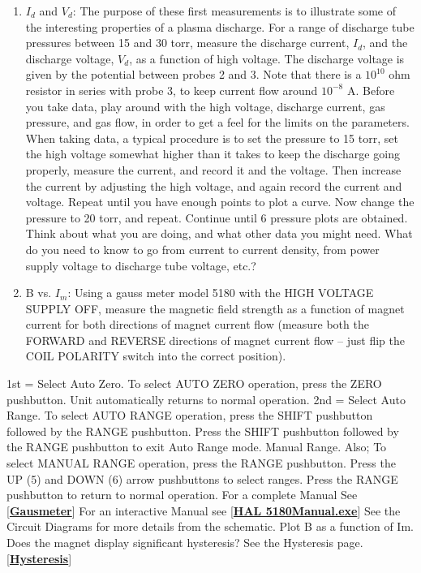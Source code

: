 \documentclass{../lab}
\begin{document}
\begin{enumerate}
    \item $I_d$ and $V_d $: The purpose of these first measurements is to illustrate some of the interesting properties of a plasma discharge. For a range of discharge tube pressures between 15 and 30 torr, measure the discharge current, $I_d$, and the discharge voltage, $V_d $, as a function of high voltage. The discharge voltage is given by the potential between probes 2 and 3. Note that there is a $10^{10}$ ohm resistor in series with probe 3, to keep current flow around $10^{-8}$ A. Before you take data, play around with the high voltage, discharge current, gas pressure, and gas flow, in order to get a feel for the limits on the parameters. When taking data, a typical procedure is to set the pressure to 15 torr, set the high voltage somewhat higher than it takes to keep the discharge going properly, measure the current, and record it and the voltage. Then increase the current by adjusting the high voltage, and again record the current and voltage. Repeat until you have enough points to plot a curve. Now change the pressure to 20 torr, and repeat. Continue until  6 pressure plots are obtained. Think about what you are doing, and what other data you might need. What do you need to know to go from current to current density, from power supply voltage to discharge tube voltage, etc.?
    \item B vs. $I_m$: Using a gauss meter model 5180 with the HIGH VOLTAGE SUPPLY OFF, measure the magnetic field strength as a function of magnet current for both directions of magnet current flow (measure both the FORWARD and REVERSE directions of magnet current flow – just flip the COIL POLARITY switch into the correct position).
\end{enumerate}

1st = Select Auto Zero. To select AUTO ZERO operation, press the ZERO pushbutton. Unit automatically returns to normal operation. 2nd = Select Auto Range. To select AUTO RANGE operation, press the SHIFT pushbutton followed by the RANGE pushbutton. Press the SHIFT pushbutton followed by the RANGE pushbutton to exit Auto Range mode. Manual Range. Also; To select MANUAL RANGE operation, press the RANGE pushbutton. Press the UP (5) and DOWN (6) arrow pushbuttons to select ranges. Press the RANGE pushbutton to return to normal operation. For a complete Manual See [\href{http://physics111.lib.berkeley.edu/Physics111/Equipment_Manuals/Gaussmeter5180.pdf}{\textbf{Gausmeter}}] For an interactive Manual see [\href{http://physics111.lib.berkeley.edu/Physics111/Reprints/HAL/5180Manual.exe}{\textbf{HAL 5180Manual.exe}}] See the Circuit Diagrams for more details from the schematic. Plot B as a function of Im. Does the magnet display significant hysteresis? See the Hysteresis page.[\href{http://experimentationlab.berkeley.edu/Hysteresis}{\textbf{Hysteresis}}]
\end{document}
